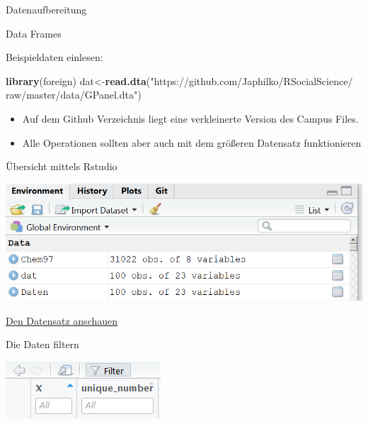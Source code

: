 \documentclass[ignorenonframetext,]{beamer}
\newenvironment{Shaded}{}{}
\newcommand{\KeywordTok}[1]{\textcolor[rgb]{0.00,0.44,0.13}{\textbf{{#1}}}}
\newcommand{\StringTok}[1]{\textcolor[rgb]{0.25,0.44,0.63}{{#1}}}
\newcommand{\NormalTok}[1]{{#1}}
\providecommand{\tightlist}{%
\setlength{\itemsep}{0pt}\setlength{\parskip}{0pt}}
\begin{document}
\begin{frame}[fragile]{Datenaufbereitung}

\begin{block}{Data Frames}

\begin{block}{Beispieldaten einlesen:}

\begin{Shaded}
\begin{Highlighting}[]
\KeywordTok{library}\NormalTok{(foreign)}
\NormalTok{dat<-}\KeywordTok{read.dta}\NormalTok{(}\StringTok{"https://github.com/Japhilko/RSocialScience/}
\StringTok{              raw/master/data/GPanel.dta"}\NormalTok{)}
\end{Highlighting}
\end{Shaded}

\begin{itemize}
\tightlist
\item
  Auf dem Github Verzeichnis liegt eine verkleinerte Version des Campus
  Files.
\item
  Alle Operationen sollten aber auch mit dem größeren Datensatz
  funktionieren
\end{itemize}

\end{block}

\end{block}

\begin{block}{Übersicht mittels Rstudio}

\includegraphics{./tex2pdf.9796/46e5b1121194c894f424f27d4be84216d8efec9e.png}

\end{block}

\begin{block}{\href{https://support.rstudio.com/hc/en-us/articles/205175388-Using-the-Data-Viewer}{Den
Datensatz anschauen}}

\begin{block}{Die Daten filtern}

\includegraphics{./tex2pdf.9796/ede672ed41a6acc2a56fb75762d0f0d2d7529ef2.png}


\end{block}
\end{block}
\end{frame}
\end{document}
